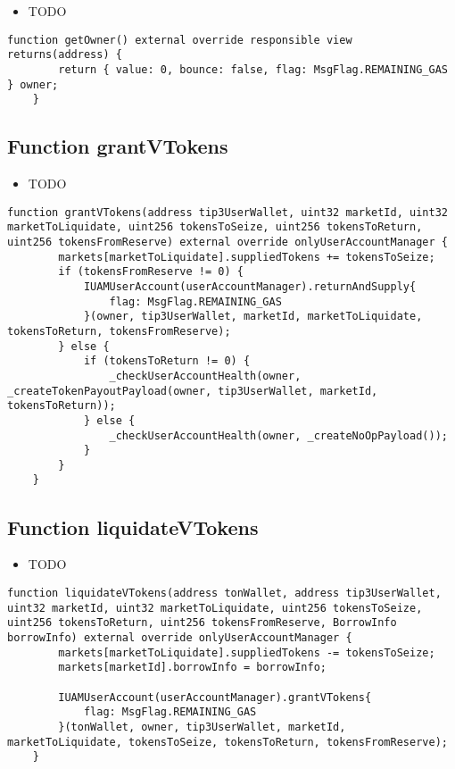 \noindent\begin{itemize}
\item TODO
\end{itemize}

\begin{lstlisting}[firstnumber=105]
    function getOwner() external override responsible view returns(address) {
        return { value: 0, bounce: false, flag: MsgFlag.REMAINING_GAS } owner;
    }
\end{lstlisting}

\subsection{Function grantVTokens}

\noindent\begin{itemize}
\item TODO
\end{itemize}

\begin{lstlisting}[firstnumber=312]
    function grantVTokens(address tip3UserWallet, uint32 marketId, uint32 marketToLiquidate, uint256 tokensToSeize, uint256 tokensToReturn, uint256 tokensFromReserve) external override onlyUserAccountManager {
        markets[marketToLiquidate].suppliedTokens += tokensToSeize;
        if (tokensFromReserve != 0) {
            IUAMUserAccount(userAccountManager).returnAndSupply{
                flag: MsgFlag.REMAINING_GAS
            }(owner, tip3UserWallet, marketId, marketToLiquidate, tokensToReturn, tokensFromReserve);
        } else {
            if (tokensToReturn != 0) {
                _checkUserAccountHealth(owner, _createTokenPayoutPayload(owner, tip3UserWallet, marketId, tokensToReturn));
            } else {
                _checkUserAccountHealth(owner, _createNoOpPayload());
            }
        }
    }
\end{lstlisting}

\subsection{Function liquidateVTokens}

\noindent\begin{itemize}
\item TODO
\end{itemize}

\begin{lstlisting}[firstnumber=303]
    function liquidateVTokens(address tonWallet, address tip3UserWallet, uint32 marketId, uint32 marketToLiquidate, uint256 tokensToSeize, uint256 tokensToReturn, uint256 tokensFromReserve, BorrowInfo borrowInfo) external override onlyUserAccountManager {
        markets[marketToLiquidate].suppliedTokens -= tokensToSeize;
        markets[marketId].borrowInfo = borrowInfo;

        IUAMUserAccount(userAccountManager).grantVTokens{
            flag: MsgFlag.REMAINING_GAS
        }(tonWallet, owner, tip3UserWallet, marketId, marketToLiquidate, tokensToSeize, tokensToReturn, tokensFromReserve);
    }
\end{lstlisting}


